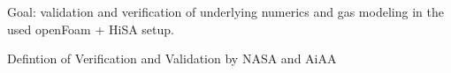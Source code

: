 Goal: validation and verification of underlying numerics and gas modeling in the used openFoam + HiSA setup.

Defintion of Verification and Validation by NASA and AiAA 